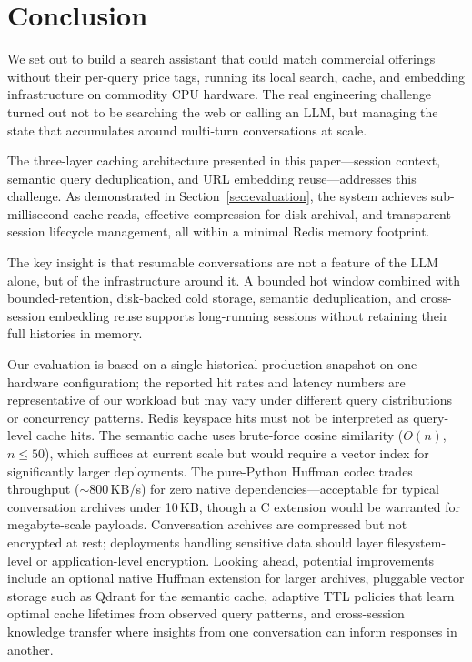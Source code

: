 \documentclass[conference]{IEEEtran}
\begin{document}
\section{Conclusion}
\label{sec:conclusion}

We set out to build a search assistant that could match commercial offerings without their per-query price tags, running its local search, cache, and embedding infrastructure on commodity CPU hardware. The real engineering challenge turned out not to be searching the web or calling an LLM, but managing the state that accumulates around multi-turn conversations at scale.

The three-layer caching architecture presented in this paper---session context, semantic query deduplication, and URL embedding reuse---addresses this challenge. As demonstrated in Section~\ref{sec:evaluation}, the system achieves sub-millisecond cache reads, effective compression for disk archival, and transparent session lifecycle management, all within a minimal Redis memory footprint.

The key insight is that resumable conversations are not a feature of the LLM alone, but of the infrastructure around it. A bounded hot window combined with bounded-retention, disk-backed cold storage, semantic deduplication, and cross-session embedding reuse supports long-running sessions without retaining their full histories in memory.

Our evaluation is based on a single historical production snapshot on one hardware configuration; the reported hit rates and latency numbers are representative of our workload but may vary under different query distributions or concurrency patterns. Redis keyspace hits must not be interpreted as query-level cache hits. The semantic cache uses brute-force cosine similarity ($O(n)$, $n \leq 50$), which suffices at current scale but would require a vector index for significantly larger deployments. The pure-Python Huffman codec trades throughput (${\sim}$800\,KB/s) for zero native dependencies---acceptable for typical conversation archives under 10\,KB, though a C extension would be warranted for megabyte-scale payloads. Conversation archives are compressed but not encrypted at rest; deployments handling sensitive data should layer filesystem-level or application-level encryption. Looking ahead, potential improvements include an optional native Huffman extension for larger archives, pluggable vector storage such as Qdrant for the semantic cache, adaptive TTL policies that learn optimal cache lifetimes from observed query patterns, and cross-session knowledge transfer where insights from one conversation can inform responses in another.





\end{document}
